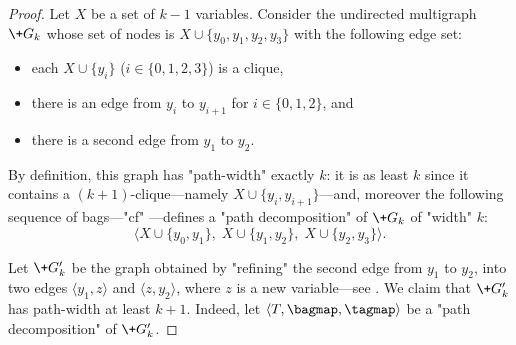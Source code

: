 \begin{proof}
	Let $X$ be a set of $k-1$ variables. Consider the undirected multigraph $\+G_k$ whose set of nodes is
	$X \cup \{y_0, y_1, y_2, y_3\}$ with the following edge set:
	\begin{itemize}
		\item each $X \cup \{y_i\}$ ($i \in \{0,1,2,3\}$) is a clique,
		\item there is an edge from $y_i$ to $y_{i+1}$  for $i \in \{0,1,2\}$, and
		\item there is a second edge from $y_1$ to $y_2$.
	\end{itemize}
	By definition, this graph has "path-width" exactly $k$: it is as least $k$ since it contains
	a $(k+1)$-clique---namely $X \cup \{y_i,y_{i+1}\}$---and, moreover the following sequence of bags---"cf" ---defines a "path decomposition" of $\+G_k$ of "width" $k$:
	\[
		\langle X \cup\{y_0,y_1\},\; X \cup\{y_1,y_2\},\; X \cup\{y_2,y_3\} \rangle.
	\]

	Let $\+G'_k$ be the graph obtained by "refining" the second edge from $y_1$ to $y_2$, into
	two edges $\langle y_1, z \rangle$ and $\langle z, y_2 \rangle$, where $z$ is a new variable---see .
	We claim that $\+G'_k$ has path-width at least $k+1$. Indeed, let
	$\langle T, \bagmap, \tagmap \rangle$ be a "path decomposition" of $\+G'_k$.
			

\end{proof}
